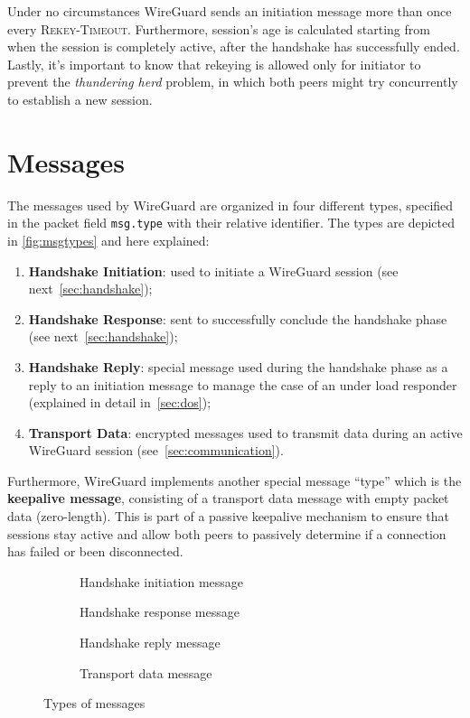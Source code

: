 \documentclass[light]{academica}
\begin{document}
Under no circumstances WireGuard sends an initiation message more than once every \textsc{Rekey-Timeout}.
Furthermore, session's age is calculated starting from when the session is completely active, \ie after the handshake has successfully ended.
Lastly, it's important to know that rekeying is allowed only for initiator to prevent the \textit{thundering herd} problem, in which both peers might try concurrently to establish a new session.

\section{Messages}

The messages used by WireGuard are organized in four different types, specified in the packet field \texttt{msg.type} with their relative identifier.
The types are depicted in \autoref{fig:msgtypes} and here explained:
\begin{enumerate}
  \item \textbf{Handshake Initiation}: used to initiate a WireGuard session (see next~\autoref{sec:handshake});
  \item \textbf{Handshake Response}: sent to successfully conclude the handshake phase (see next~\autoref{sec:handshake});
  \item \textbf{Handshake Reply}: special message used during the handshake phase as a reply to an initiation message to manage the case of an under load responder (explained in detail in~\autoref{sec:dos});
  \item \textbf{Transport Data}: encrypted messages used to transmit data during an active WireGuard session (see~\autoref{sec:communication}).
\end{enumerate}

Furthermore, WireGuard implements another special message ``type'' which is the \textbf{keepalive message}, consisting of a transport data message with empty packet data (zero-length).
This is part of a passive keepalive mechanism to ensure that sessions stay active and allow both peers to passively determine if a connection has failed or been disconnected.

\begin{figure}
  \begin{subfigure}{0.48\textwidth}
    
    \caption{Handshake initiation message}
  \end{subfigure}
  \hfill
  \begin{subfigure}{0.48\textwidth}
    
    \caption{Handshake response message}
  \end{subfigure}

  \bigskip
  \begin{subfigure}{0.48\textwidth}
    
    \caption{Handshake reply message}
  \end{subfigure}
  \hfill
  \begin{subfigure}{0.48\textwidth}
    
    \caption{Transport data message}
  \end{subfigure}
  \caption{Types of messages}
  \label{fig:msgtypes}
\end{figure}
\end{document}
